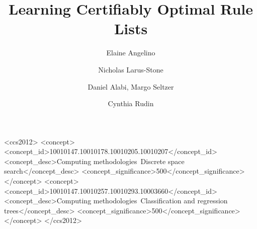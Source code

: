 \documentclass[sigconf]{acmart}
\begin{document}
\title{Learning Certifiably Optimal Rule Lists}

\author{Elaine Angelino}

%
%

\author{Nicholas Larus-Stone}
\author{Daniel Alabi, Margo Seltzer}

\author{Cynthia Rudin}

\renewcommand{\shortauthors}{E. Angelino et al.}


\begin{abstract}

\end{abstract}

\setlength{\abovedisplayskip}{3pt}
\setlength{\belowdisplayskip}{3pt}
\setlength{\belowcaptionskip}{-10pt}

%
%
\begin{CCSXML}
<ccs2012>
<concept>
<concept_id>10010147.10010178.10010205.10010207</concept_id>
<concept_desc>Computing methodologies~Discrete space search</concept_desc>
<concept_significance>500</concept_significance>
</concept>
<concept>
<concept_id>10010147.10010257.10010293.10003660</concept_id>
<concept_desc>Computing methodologies~Classification and regression trees</concept_desc>
<concept_significance>500</concept_significance>
</concept>
</ccs2012>
\end{CCSXML}
\end{document}

